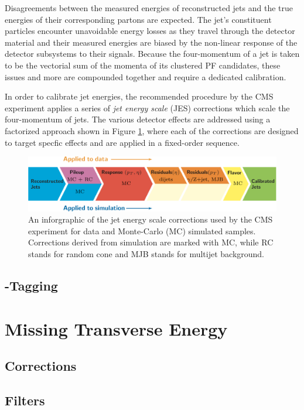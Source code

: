 Disagreements between the measured energies of reconstructed jets and the true energies of their corresponding partons are expected. The jet's constituent particles encounter unavoidable energy losses as they travel through the detector material and their measured energies are biased by the non-linear response of the detector subsystems to their signals. Because the four-momentum of a jet is taken to be the vectorial sum of the momenta of its clustered PF candidates, these issues and more are compounded together and require a dedicated calibration.

In order to calibrate jet energies, the recommended procedure by the CMS experiment applies a series of \textit{jet energy scale} (JES) corrections which scale the four-momentum of jets. The various detector effects are addressed using a factorized approach shown in Figure \ref{fig:jeschain}, where each of the corrections are designed to target specfic effects and are applied in a fixed-order sequence.

\begin{figure}[htbp]
  \centering
    \includegraphics[width=6in]{images/jeschain}
    \caption[Jet Energy Scale Corrections Infographic]{An inforgraphic of the jet energy scale corrections used by the CMS experiment for data and Monte-Carlo (MC) simulated samples. Corrections derived from simulation are marked with MC, while RC stands for random cone and MJB stands for multijet background.\cite{CMSJES}}
    \label{fig:jeschain}
\end{figure}

\subsection{\qrkb-Tagging}

\section{Missing Transverse Energy}

\subsection{Corrections}

\subsection{Filters}

